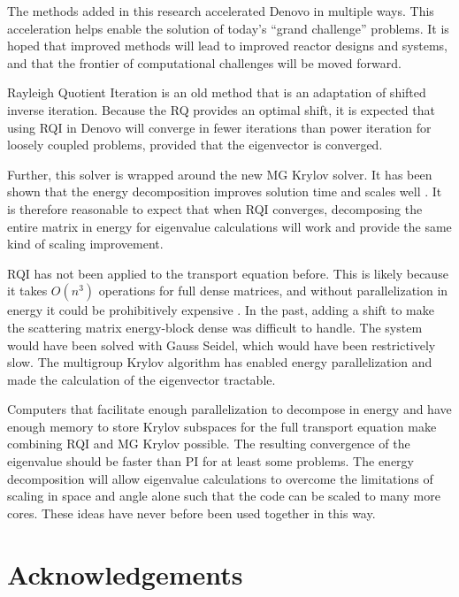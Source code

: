 \documentclass[preprint,12pt]{elsarticle}
\begin{document}
The methods added in this research accelerated Denovo in multiple ways. This acceleration helps enable the solution of today’s “grand challenge” problems. It is hoped that improved methods will lead to improved reactor designs and systems, and that the frontier of computational challenges will be moved forward.

Rayleigh Quotient Iteration is an old method that is an adaptation of shifted inverse iteration. Because the RQ provides an optimal shift, it is expected that using RQI in Denovo will converge in fewer iterations than power iteration for loosely coupled problems, provided that the eigenvector is converged. 

Further, this solver is wrapped around the new MG Krylov solver. It has been shown that the energy decomposition improves solution time and scales well \cite{Slaybaugh2011}. It is therefore reasonable to expect that when RQI converges, decomposing the entire matrix in energy for eigenvalue calculations will work and provide the same kind of scaling improvement.

RQI has not been applied to the transport equation before. This is likely because it takes $O(n^{3})$ operations for full dense matrices, and without parallelization in energy it could be prohibitively expensive \cite{Stewart2001}. In the past, adding a shift to make the scattering matrix energy-block dense was difficult to handle. The system would have been solved with Gauss Seidel, which would have been restrictively slow. The multigroup Krylov algorithm has enabled energy parallelization and made the calculation of the eigenvector tractable. 

Computers that facilitate enough parallelization to decompose in energy and have enough memory to store Krylov subspaces for the full transport equation make combining RQI and MG Krylov possible. The resulting convergence of the eigenvalue should be faster than PI for at least some problems. The energy decomposition will allow eigenvalue calculations to overcome the limitations of scaling in space and angle alone such that the code can be scaled to many more cores. These ideas have never before been used together in this way.  



\section{Acknowledgements}
\end{document}
